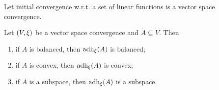 \begin{proposition} \label{initialVectorConvergenceLinearFunctions}
Let initial convergence w.r.t. a set of linear functions is a vector space convergence.
\end{proposition}

\begin{proposition}
Let $\left( V,\xi \right)$ be a vector space convergence and $A\subseteq V$. Then
\begin{enumerate}
\item if $A$ is balanced, then $\operatorname{adh}_\xi(A)$ is balanced;
\item if $A$ is convex, then $\operatorname{adh}_\xi(A)$ is convex;
\item if $A$ is a subspace, then $\operatorname{adh}_\xi(A)$ is a subspace.
\end{enumerate}
\end{proposition}
